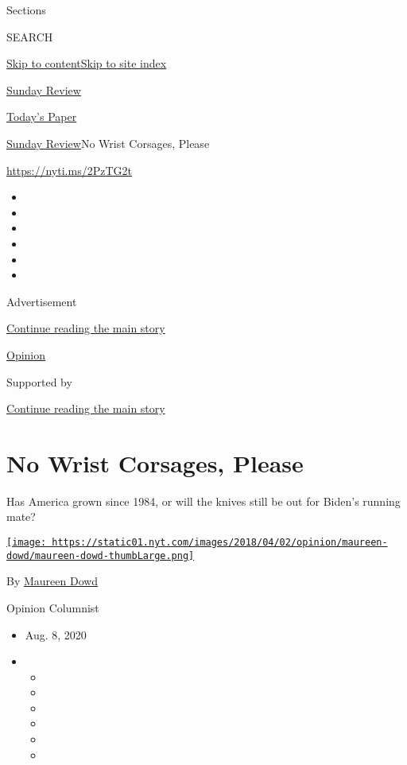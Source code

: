 Sections

SEARCH

\protect\hyperlink{site-content}{Skip to
content}\protect\hyperlink{site-index}{Skip to site index}

\href{https://www.nytimes.com/section/opinion/sunday}{Sunday Review}

\href{https://myaccount.nytimes.com/auth/login?response_type=cookie\&client_id=vi}{}

\href{https://www.nytimes.com/section/todayspaper}{Today's Paper}

\href{/section/opinion/sunday}{Sunday Review}\textbar{}No Wrist
Corsages, Please

\href{https://nyti.ms/2PzTG2t}{https://nyti.ms/2PzTG2t}

\begin{itemize}
\item
\item
\item
\item
\item
\item
\end{itemize}

Advertisement

\protect\hyperlink{after-top}{Continue reading the main story}

\href{/section/opinion}{Opinion}

Supported by

\protect\hyperlink{after-sponsor}{Continue reading the main story}

\hypertarget{no-wrist-corsages-please}{%
\section{No Wrist Corsages, Please}\label{no-wrist-corsages-please}}

Has America grown since 1984, or will the knives still be out for
Biden's running mate?

\href{https://www.nytimes.com/by/maureen-dowd}{\texttt{[image: https://static01.nyt.com/images/2018/04/02/opinion/maureen-dowd/maureen-dowd-thumbLarge.png]}}

By \href{https://www.nytimes.com/by/maureen-dowd}{Maureen Dowd}

Opinion Columnist

\begin{itemize}
\item
  Aug. 8, 2020
\item
  \begin{itemize}
  \item
  \item
  \item
  \item
  \item
  \item
  \end{itemize}
\end{itemize}


